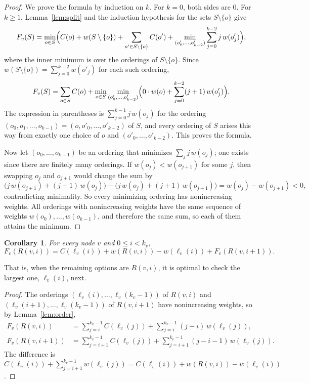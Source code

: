 \documentclass[11pt]{article}
\newtheorem{corollary}[theorem]{Corollary}
\begin{document}
\begin{proof}
  We prove the formula by induction on $k$. For $k = 0$, both sides are $0$. For
  $k \ge 1$, Lemma~\ref{lem:split} and the induction hypothesis for the sets
  $S \setminus \{o\}$ give
  \[
    F_v(S) = \min_{o \in S} \Bigl( C(o) + w(S \setminus \{o\})
      + \sum_{o' \in S \setminus \{o\}} C(o')
      + \min_{(o'_0, \dots, o'_{k-2})} \sum_{j=0}^{k-2} j \, w(o'_j) \Bigr),
  \]
  where the inner minimum is over the orderings of $S \setminus \{o\}$. Since
  $w(S \setminus \{o\}) = \sum_{j=0}^{k-2} w(o'_j)$ for each such ordering,
  \[
    F_v(S) = \sum_{o \in S} C(o) + \min_{o \in S}
      \min_{(o'_0, \dots, o'_{k-2})} \Bigl( 0 \cdot w(o)
      + \sum_{j=0}^{k-2} (j + 1) \, w(o'_j) \Bigr).
  \]
  The expression in parentheses is $\sum_{j=0}^{k-1} j \, w(o_j)$ for the
  ordering $(o_0, o_1, \dots, o_{k-1}) = (o, o'_0, \dots, o'_{k-2})$ of $S$, and
  every ordering of $S$ arises this way from exactly one choice of $o$ and
  $(o'_0, \dots, o'_{k-2})$. This proves the formula.

  Now let $(o_0, \dots, o_{k-1})$ be an ordering that minimizes
  $\sum_j j \, w(o_j)$; one exists since there are finitely many orderings. If
  $w(o_j) < w(o_{j+1})$ for some $j$, then swapping $o_j$ and $o_{j+1}$ would
  change the sum by
  \[
    \bigl( j \, w(o_{j+1}) + (j + 1) \, w(o_j) \bigr)
    - \bigl( j \, w(o_j) + (j + 1) \, w(o_{j+1}) \bigr)
    = w(o_j) - w(o_{j+1}) < 0,
  \]
  contradicting minimality. So every minimizing ordering has nonincreasing
  weights. All orderings with nonincreasing weights have the same sequence of
  weights $w(o_0), \dots, w(o_{k-1})$, and therefore the same sum, so each of
  them attains the minimum.
\end{proof}

\begin{corollary}
  \label{cor:first}
  For every node $v$ and $0 \le i < k_v$,
  \[
    F_v(R(v, i)) = C(\ell_v(i)) + w(R(v, i)) - w(\ell_v(i)) + F_v(R(v, i + 1)).
  \]
\end{corollary}

That is, when the remaining options are $R(v, i)$, it is optimal to check the
largest one, $\ell_v(i)$, next.

\begin{proof}
  The orderings $(\ell_v(i), \dots, \ell_v(k_v - 1))$ of $R(v, i)$ and
  $(\ell_v(i + 1), \dots, \ell_v(k_v - 1))$ of $R(v, i + 1)$ have nonincreasing
  weights, so by Lemma~\ref{lem:order},
  \begin{align*}
    F_v(R(v, i)) &= \sum_{j=i}^{k_v - 1} C(\ell_v(j))
      + \sum_{j=i}^{k_v - 1} (j - i) \, w(\ell_v(j)), \\
    F_v(R(v, i + 1)) &= \sum_{j=i+1}^{k_v - 1} C(\ell_v(j))
      + \sum_{j=i+1}^{k_v - 1} (j - i - 1) \, w(\ell_v(j)).
  \end{align*}
  The difference is $C(\ell_v(i)) + \sum_{j=i+1}^{k_v - 1} w(\ell_v(j))
  = C(\ell_v(i)) + w(R(v, i)) - w(\ell_v(i))$.
\end{proof}
\end{document}
